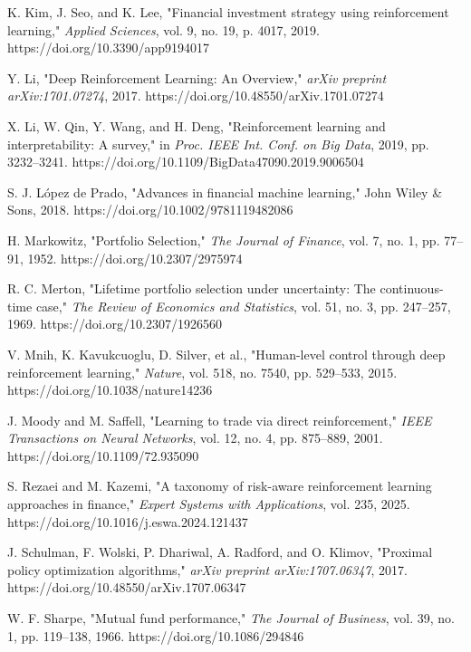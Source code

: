 \documentclass[conference]{IEEEtran}
\begin{document}
\begin{thebibliography}{30}
		K. Kim, J. Seo, and K. Lee, "Financial investment strategy using reinforcement learning," \textit{Applied Sciences}, vol. 9, no. 19, p. 4017, 2019. https://doi.org/10.3390/app9194017
		
		Y. Li, "Deep Reinforcement Learning: An Overview," \textit{arXiv preprint arXiv:1701.07274}, 2017. https://doi.org/10.48550/arXiv.1701.07274
		
		X. Li, W. Qin, Y. Wang, and H. Deng, "Reinforcement learning and interpretability: A survey," in \textit{Proc. IEEE Int. Conf. on Big Data}, 2019, pp. 3232–3241. https://doi.org/10.1109/BigData47090.2019.9006504
		
		S. J. López de Prado, "Advances in financial machine learning," John Wiley \& Sons, 2018. https://doi.org/10.1002/9781119482086
		
		H. Markowitz, "Portfolio Selection," \textit{The Journal of Finance}, vol. 7, no. 1, pp. 77–91, 1952. https://doi.org/10.2307/2975974
		
		R. C. Merton, "Lifetime portfolio selection under uncertainty: The continuous-time case," \textit{The Review of Economics and Statistics}, vol. 51, no. 3, pp. 247–257, 1969. https://doi.org/10.2307/1926560
		
		V. Mnih, K. Kavukcuoglu, D. Silver, et al., "Human-level control through deep reinforcement learning," \textit{Nature}, vol. 518, no. 7540, pp. 529–533, 2015. https://doi.org/10.1038/nature14236
		
		J. Moody and M. Saffell, "Learning to trade via direct reinforcement," \textit{IEEE Transactions on Neural Networks}, vol. 12, no. 4, pp. 875–889, 2001. https://doi.org/10.1109/72.935090
		
		S. Rezaei and M. Kazemi, "A taxonomy of risk-aware reinforcement learning approaches in finance," \textit{Expert Systems with Applications}, vol. 235, 2025. https://doi.org/10.1016/j.eswa.2024.121437
		
		J. Schulman, F. Wolski, P. Dhariwal, A. Radford, and O. Klimov, "Proximal policy optimization algorithms," \textit{arXiv preprint arXiv:1707.06347}, 2017. https://doi.org/10.48550/arXiv.1707.06347
		
		W. F. Sharpe, "Mutual fund performance," \textit{The Journal of Business}, vol. 39, no. 1, pp. 119–138, 1966. https://doi.org/10.1086/294846
		

\end{thebibliography}
\end{document}
